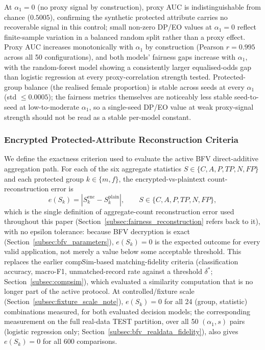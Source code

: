 \documentclass[a4paper,fleqn]{cas-dc}
\begin{document}
At $\alpha_1=0$ (no proxy signal by construction), proxy AUC is indistinguishable from chance ($0.5005$), confirming the synthetic protected attribute carries no recoverable signal in this control; small non-zero DP/EO values at $\alpha_1=0$ reflect finite-sample variation in a balanced random split rather than a proxy effect. Proxy AUC increases monotonically with $\alpha_1$ by construction (Pearson $r=0.995$ across all 50 configurations), and both models' fairness gaps increase with $\alpha_1$, with the random-forest model showing a consistently larger equalised-odds gap than logistic regression at every proxy-correlation strength tested. Protected-group balance (the realised female proportion) is stable across seeds at every $\alpha_1$ (std $\leq 0.0005$); the fairness metrics themselves are noticeably less stable seed-to-seed at low-to-moderate $\alpha_1$, so a single-seed DP/EO value at weak proxy-signal strength should not be read as a stable per-model constant.

\subsubsection{Encrypted Protected-Attribute Reconstruction Criteria} \label{subsec:matching_criteria} We define the exactness criterion used to evaluate the active BFV direct-additive aggregation path. For each of the six aggregate statistics $S\in\{C,A,P,TP,N,FP\}$ and each protected group $k\in\{m,f\}$, the encrypted-vs-plaintext count-reconstruction error is \[ e(S_k) = \left| S_k^{\mathrm{enc}} - S_k^{\mathrm{plain}} \right|, \qquad S\in\{C,A,P,TP,N,FP\}, \] which is the single definition of aggregate-count reconstruction error used throughout this paper (Section~\ref{subsec:fairness_reconstruction} refers back to it), with no epsilon tolerance: because BFV decryption is exact (Section~\ref{subsec:bfv_parameters}), $e(S_k)=0$ is the expected outcome for every valid application, not merely a value below some acceptable threshold. This replaces the earlier compSim-based matching-fidelity criteria (classification accuracy, macro-F1, unmatched-record rate against a threshold $\delta^{*}$; Section~\ref{subsec:compsim}), which evaluated a similarity computation that is no longer part of the active protocol. At controlled/fixture scale (Section~\ref{subsec:fixture_scale_note}), $e(S_k)=0$ for all 24 (group, statistic) combinations measured, for both evaluated decision models; the corresponding measurement on the full real-data TEST partition, over all 50 $(\alpha_1,s)$ pairs (logistic regression only; Section~\ref{subsec:bfv_realdata_fidelity}), also gives $e(S_k)=0$ for all 600 comparisons.
\end{document}
